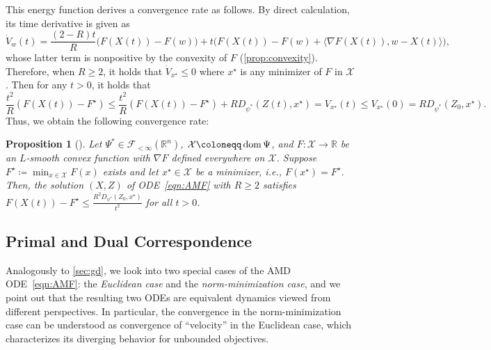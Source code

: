 \documentclass[11pt,a4paper]{article}
\theoremstyle{definition}
\theoremstyle{plain}
\newtheorem{prop}[prop]{Proposition}
\newcommand{\RR}{{\mathbb{R}}}
\newcommand{\dom}{\mathop{\rm dom}}
\begin{document}
This energy function derives a convergence rate as follows.
By direct calculation, its time derivative is given as
\begin{equation}
    \label{eqn:amd-diff}
    \dot V_w(t) = \frac{(2 - R)t}R\bigl(F(X(t)) - F(w)\bigr) + t\bigl(F(X(t)) - F(w) + \langle\nabla F(X(t)), w - X(t)\rangle\bigr),
\end{equation}
whose latter term is nonpositive by the convexity of $F$ (\cref{prop:convexity}).
Therefore, when $R \ge 2$, it holds that $\dot V_{x^\star} \le 0$ where $x^\star$ is any minimizer of $F$ in $\mathcal{X}$.
Then for any $t > 0$, it holds that
\[
    \frac{t^2}R\left(F(X(t)) - F^\star\right) \le \frac{t^2}R\left(F(X(t)) - F^\star\right) + RD_{\psi^\ast}(Z(t), x^\star) = V_{x^\star}(t) \le V_{x^\star}(0) = RD_{\psi^\ast}(Z_0, x^\star).
\]
Thus, we obtain the following convergence rate:

\begin{prop}[{\cite[Theorem~2]{KBB2015}}]
    \label{prop:AMF_value}
    Let $\Psi^\ast \in \mathcal{F}_{<\infty}(\RR^n)$, $\mathcal{X} \coloneqq \dom \Psi$, and $F:\mathcal{X} \to \RR$ be an $L$-smooth convex function with $\nabla F$ defined everywhere on $\mathcal{X}$.
    Suppose $F^\star \coloneqq \min_{x \in \mathcal{X}}F(x)$ exists and let $x^\star \in \mathcal{X}$ be a minimizer, i.e., $F(x^\star) = F^\star$.
    Then, the solution $(X, Z)$ of ODE~\eqref{eqn:AMF} with $R \ge 2$ satisfies $F(X(t)) - F^\star \le \frac{R^2D_{\psi^\ast}(Z_0, x^\star)}{t^2}$ for all $t > 0$.
\end{prop}

\subsection{Primal and Dual Correspondence}\label{subsec:correspondence}
Analogously to \cref{sec:gd}, we look into two special cases of the AMD ODE~\eqref{eqn:AMF}: the \textit{Euclidean case} and the \textit{norm-minimization case}, and we point out that the resulting two ODEs are equivalent dynamics viewed from different perspectives.
In particular, the convergence in the norm-minimization case can be understood as convergence of ``velocity'' in the Euclidean case, which characterizes its diverging behavior for unbounded objectives.
\end{document}

